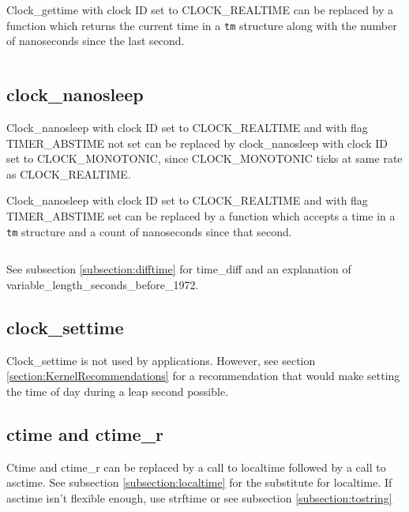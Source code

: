 \documentclass[letterpaper,twoside]{article}
\begin{document}
Clock\_gettime with clock ID set to CLOCK\_REAL\-TIME can be replaced by
a function which returns the current time in a \verb|tm| structure along
with the number of nanoseconds since the last second.
\inputminted[firstline=34]{c}{time_current_tm_nano.c}

\subsection{clock\_nanosleep}
Clock\_nanosleep with clock ID set to CLOCK\_REAL\-TIME and with flag
TIMER\_ABS\-TIME not set can be replaced by clock\_nanosleep with
clock ID set to CLOCK\_MONO\-TONIC, since CLOCK\_MONO\-TONIC ticks at
same rate as CLOCK\_REAL\-TIME.

Clock\_nanosleep with clock ID set to CLOCK\_REAL\-TIME and with flag
TIMER\_ABS\-TIME set can be replaced by a function which accepts
a time in a \verb|tm| structure and a count of nanoseconds since that second.
\inputminted[firstline=32]{c}{time_sleep_until.c}
See subsection \ref{subsection:difftime} for time\_diff
and an explanation of variable\_length\_sec\-onds\_before\_1972.

\subsection{clock\_settime}
Clock\_settime is not used by applications.
However, see section \ref{section:KernelRecommendations} for a
recommendation that would make setting the time of day during a
leap second possible.

\subsection{ctime and ctime\_r}
Ctime and ctime\_r can be replaced by a call to localtime followed by
a call to asctime.  See subsection \ref{subsection:localtime}
for the substitute for localtime.
If asctime isn't flexible enough, use strftime or see subsection
\ref{subsection:tostring}
\end{document}

